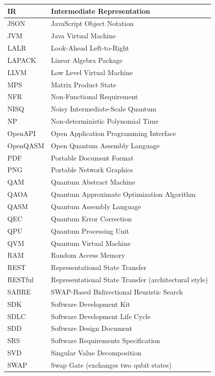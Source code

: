 \begin{longtable}{|p{3cm}|p{10cm}|}
\hline
IR & Intermediate Representation \\
\hline
JSON & JavaScript Object Notation \\
\hline
JVM & Java Virtual Machine \\
\hline
LALR & Look-Ahead Left-to-Right \\
\hline
LAPACK & Linear Algebra Package \\
\hline
LLVM & Low Level Virtual Machine \\
\hline
MPS & Matrix Product State \\
\hline
NFR & Non-Functional Requirement \\
\hline
NISQ & Noisy Intermediate-Scale Quantum \\
\hline
NP & Non-deterministic Polynomial Time \\
\hline
OpenAPI & Open Application Programming Interface \\
\hline
OpenQASM & Open Quantum Assembly Language \\
\hline
PDF & Portable Document Format \\
\hline
PNG & Portable Network Graphics \\
\hline
QAM & Quantum Abstract Machine \\
\hline
QAOA & Quantum Approximate Optimization Algorithm \\
\hline
QASM & Quantum Assembly Language \\
\hline
QEC & Quantum Error Correction \\
\hline
QPU & Quantum Processing Unit \\
\hline
QVM & Quantum Virtual Machine \\
\hline
RAM & Random Access Memory \\
\hline
REST & Representational State Transfer \\
\hline
RESTful & Representational State Transfer (architectural style) \\
\hline
SABRE & SWAP-Based Bidirectional Heuristic Search \\
\hline
SDK & Software Development Kit \\
\hline
SDLC & Software Development Life Cycle \\
\hline
SDD & Software Design Document \\
\hline
SRS & Software Requirements Specification \\
\hline
SVD & Singular Value Decomposition \\
\hline
SWAP & Swap Gate (exchanges two qubit states) \\
\hline

\end{longtable}

